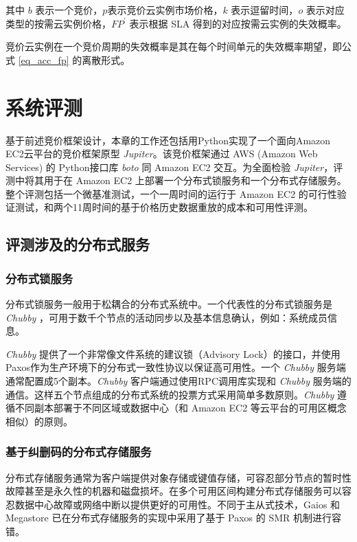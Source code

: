 其中 $b$ 表示一个竞价，$p$表示竞价云实例市场价格，$k$ 表示逗留时间，$o$ 表示对应类型的按需云实例价格，$FP^{\prime}$ 表示根据 SLA 得到的对应按需云实例的失效概率。

竞价云实例在一个竞价周期的失效概率是其在每个时间单元的失效概率期望，即公式 \eqref{eq_acc_fp} 的离散形式。

\section{系统评测}
\label{sec:jupiter-evaluation}
基于前述竞价框架设计，本章的工作还包括用Python实现了一个面向Amazon EC2云平台的竞价框架原型 \emph{Jupiter}。该竞价框架通过 AWS (Amazon Web Services) 的 Python接口库 \emph{boto} \cite{boto:2014} 同 Amazon EC2 交互。为全面检验 \emph{Jupiter}，评测中将其用于在 Amazon EC2 上部署一个分布式锁服务和一个分布式存储服务。整个评测包括一个微基准测试，一个一周时间的运行于 Amazon EC2 的可行性验证测试，和两个11周时间的基于价格历史数据重放的成本和可用性评测。

\subsection{评测涉及的分布式服务}
\label{subsec:jupiter-bc}

\subsubsection{分布式锁服务}
\label{subsection-case-dls}
分布式锁服务一般用于松耦合的分布式系统中。一个代表性的分布式锁服务是 \emph{Chubby} \cite{Burrows:2006:CLS:1298455.1298487}，可用于数千个节点的活动同步以及基本信息确认，例如：系统成员信息。

\emph{Chubby} 提供了一个非常像文件系统的建议锁（Advisory Lock）的接口，并使用Paxos作为生产环境下的分布式一致性协议以保证高可用性。一个 \emph{Chubby} 服务端通常配置成5个副本。\emph{Chubby} 客户端通过使用RPC调用库实现和 \emph{Chubby} 服务端的通信。这样五个节点组成的分布式系统的投票方式采用简单多数原则。\emph{Chubby} 遵循不同副本部署于不同区域或数据中心（和 Amazon EC2 等云平台的可用区概念相似）的原则。

\subsubsection{基于纠删码的分布式存储服务}
\label{subsubsec:dss}
分布式存储服务通常为客户端提供对象存储或键值存储，可容忍部分节点的暂时性故障甚至是永久性的机器和磁盘损坏。在多个可用区间构建分布式存储服务可以容忍数据中心故障或网络中断以提供更好的可用性。不同于主从式技术，Gaios \cite{Bolosky:2011:PRS:1972457.1972472} 和 Megastore \cite{baker2011megastore} 已在分布式存储服务的实现中采用了基于 Paxos 的 SMR 机制进行容错。

